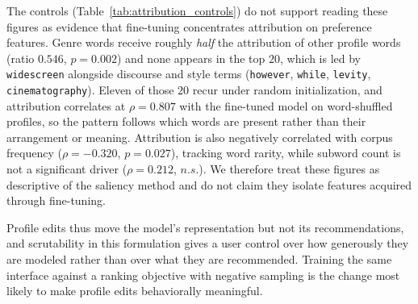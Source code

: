 The controls (Table~\ref{tab:attribution_controls}) do not support reading these figures as evidence that fine-tuning concentrates attribution on preference features. Genre words receive roughly \emph{half} the attribution of other profile words (ratio $0.546$, $p{=}0.002$) and none appears in the top $20$, which is led by \texttt{widescreen} alongside discourse and style terms (\texttt{however}, \texttt{while}, \texttt{levity}, \texttt{cinematography}). Eleven of those $20$ recur under random initialization, and attribution correlates at $\rho{=}0.807$ with the fine-tuned model on word-shuffled profiles, so the pattern follows which words are present rather than their arrangement or meaning. Attribution is also negatively correlated with corpus frequency ($\rho{=}-0.320$, $p{=}0.027$), tracking word rarity, while subword count is not a significant driver ($\rho{=}0.212$, $n.s.$). We therefore treat these figures as descriptive of the saliency method and do not claim they isolate features acquired through fine-tuning.

Profile edits thus move the model's representation but not its recommendations, and scrutability in this formulation gives a user control over how generously they are modeled rather than over what they are recommended. Training the same interface against a ranking objective with negative sampling is the change most likely to make profile edits behaviorally meaningful.

%

